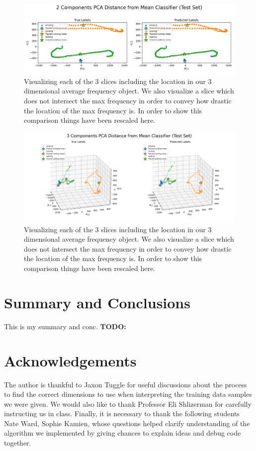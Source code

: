\documentclass[11pt]{amsart}
\begin{document}
\begin{figure}[h]
	\centering
	\includegraphics[width=.75\textwidth]{../visualizations/pca_distance_from_mean_classifier_2d_test_set.png}
 	\caption{Visualizing each of the 3 slices including the location in our 3 dimensional average frequency object. We also visualize a slice which does not intersect the max frequency in order to convey how drastic the location of the max frequency is. In order to show this comparison things have been rescaled here.}\label{fig:f5}
\end{figure}

\begin{figure}[h]
	\centering
	\includegraphics[width=.75\textwidth]{../visualizations/pca_distance_from_mean_classifier_3d_test_set.png}
 	\caption{Visualizing each of the 3 slices including the location in our 3 dimensional average frequency object. We also visualize a slice which does not intersect the max frequency in order to convey how drastic the location of the max frequency is. In order to show this comparison things have been rescaled here.}\label{fig:f6}
\end{figure}

\section{Summary and Conclusions}\label{sec:conclusions}
This is my summary and conc. \textbf{TODO:}

\section*{Acknowledgements} 

The author is thankful to Jaxon Tuggle for useful discussions about the process to find the correct dimensions to use when interpreting the training data samples we were given.
We would also like to thank Professor Eli Shlizerman for carefully instructing us in class.
Finally, it is necessary to thank the following students Nate Ward, Sophie Kamien, whose questions helped clarify understanding of the algorithm we implemented by giving chances to explain ideas and debug code together.


\end{document}
